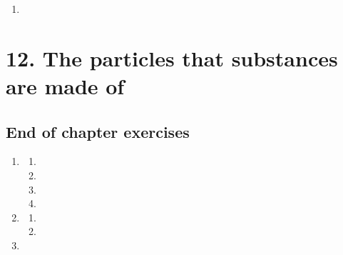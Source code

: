 \begin{enumerate}[itemsep=20pt, label=\textbf{\arabic*}.]
\begin{enumerate}[noitemsep, label=\textbf{(\alph*)} ]
\end{enumerate}


\item %

\end{enumerate}

\section {12. The particles that substances are made of}
\subsection{End of chapter exercises} %

\begin{enumerate}[itemsep=6pt, label=\textbf{\arabic*}. ] 
\item %

    \begin{enumerate}[noitemsep, label=\textbf{(\alph*)} ]
  \item %
\item %
\item %
\item %
 \end{enumerate}
\item %

    \begin{enumerate}[noitemsep, label=\textbf{(\alph*)} ]
 \item %
\item %

\end{enumerate}

\item %
\end{enumerate}

